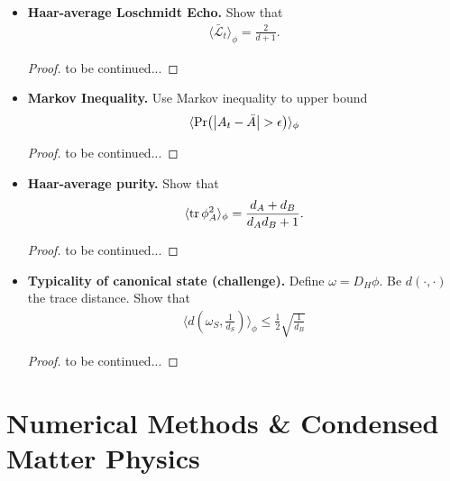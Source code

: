 \documentclass{book}
\theoremstyle{definition}
\newcommand{\lag}{\mathcal{L}}
\newcommand{\f}[2]{\frac{#1}{#2}}
\newcommand{\lp}{\left(}
\newcommand{\rp}{\right)}
\begin{document}
\begin{itemize}
	\item \textbf{Haar-average Loschmidt Echo.} Show that
	\begin{align}
	\langle \bar{\lag}_t \rangle_\phi = \f{2}{d+1}.
	\end{align}
	
	
	\begin{proof}
		to be continued...
	\end{proof}
	
	
	\item \textbf{Markov Inequality.} Use Markov inequality to upper bound
	\begin{align}
	\langle \Pr(\abs{A_t - \bar{A}} > \epsilon)\rangle_\phi
	\end{align}
	
	
	\begin{proof}
		to be continued...
	\end{proof}
	
	\item \textbf{Haar-average purity.} Show that
	\begin{align}
	\langle \tr \phi_A^2 \rangle_\phi = \f{d_A + d_B}{d_A d_B + 1}.
	\end{align}
	
	
	\begin{proof}
		to be continued...
	\end{proof}


	\item \textbf{Typicality of canonical state (challenge).} Define $\omega = D_H \phi$. Be $d(\cdot,\cdot)$ the trace distance. Show that
	\begin{align}
	\langle d\lp \omega_S, \f{1}{d_S} \rp \rangle_\phi \leq \f{1}{2}\sqrt{\f{1}{d_B}}
	\end{align}
	
	\begin{proof}
		to be continued... 
	\end{proof}
\end{itemize}














\newpage
\chapter{Numerical Methods \& Condensed Matter Physics}
\end{document}
